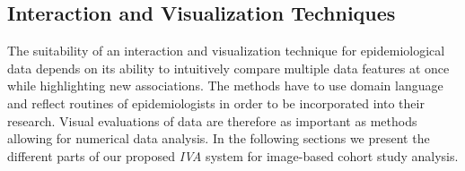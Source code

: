 \documentclass[journal]{style/vgtc} 			          %
\begin{document}
\subsection{Interaction and Visualization Techniques} \label{Interaction- and Visualization Techniques}
%
%
The suitability of an interaction and visualization technique for epidemiological data depends on its ability to intuitively compare multiple data features at once while highlighting new associations.
%
%
The methods have to use domain language and reflect routines of epidemiologists in order to be incorporated into their research.
%
Visual evaluations of data are therefore as important as methods allowing for numerical data analysis.
%
In the following sections we present the different parts of our proposed \emph{IVA} system for image-based cohort study analysis.

\end{document}
